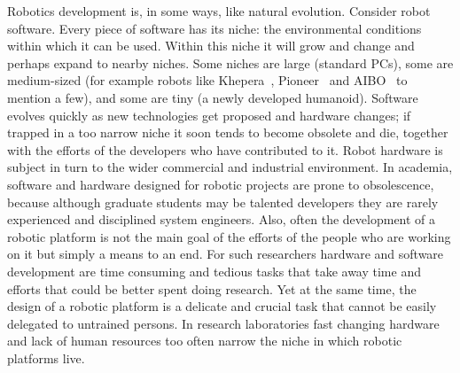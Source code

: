 

Robotics development is, in some ways, like natural 
evolution. Consider robot software.
Every piece of software has its niche:
the environmental conditions within which it can be
used.  Within this niche it will grow and change and 
perhaps expand to nearby niches.
Some niches are large (standard PCs),
some are medium-sized (for example robots like 
Khepera~\cite{kephera}, 
Pioneer~\cite{pioneer} and 
AIBO~\cite{aibo} to mention a few), and some are tiny (a newly 
developed humanoid). 
Software evolves quickly as new technologies get proposed 
and hardware changes; if trapped 
in a too narrow niche it soon tends to become obsolete and die, 
together with the efforts of the developers who have contributed 
to it. 
Robot hardware is subject in turn to the wider commercial and
industrial environment.
In academia, software and hardware designed for robotic 
projects are prone to obsolescence, 
because although graduate students may be 
talented developers they are rarely
experienced and disciplined system engineers.
Also, often the development of a robotic platform is not the main goal 
of the efforts of the people who are working on it but
simply a means to an end.
For such researchers hardware and software development are time 
consuming and tedious tasks that take away time and efforts that 
could be better spent doing research. Yet at the same time, the 
design of a robotic platform is a delicate and crucial task that 
cannot be easily delegated to untrained persons. In research 
laboratories fast changing hardware and lack of human resources 
too often narrow the niche in which robotic platforms live.


